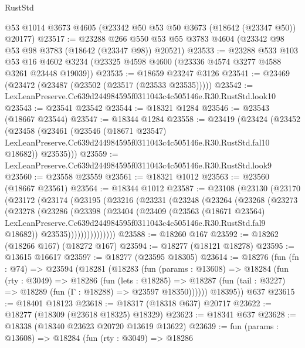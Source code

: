 \begin{lexlean}{RustStd}
\begin{coremodule}
    @53
    @1014
    @3673
    @4605
    (@23342 @50 @53 @50 @3673 (@18642 (@23347 @50)) @20177)
@23517 := @23288
    @266
    @550
    @53
    @55
    @3783
    @4604
    (@23342 @98 @53 @98 @3783 (@18642 (@23347 @98)) @20521)
@23533 := @23288
    @533
    @103
    @53
    @16
    @4602
    @3234
    (@23325 @4598 @4600 (@23336 @4574 @3277 @4588 @3261 @23448 @19039))
@23535 := @18659 @23247 @3126
@23541 := @23469 (@23472 (@23487 (@23502 (@23517 (@23533 @23535)))))
@23542 := LexLeanPreserve.Cc639d244984595f0311043c4c505146e.R30.RustStd.look10
@23543 := @23541 @23542
@23544 := @18321 @1284
@23546 := @23543 (@18667 @23544)
@23547 := @18344 @1284
@23558 := @23419
    (@23424
      (@23452
        (@23458
          (@23461
            (@23546
              (@18671 @23547)
              LexLeanPreserve.Cc639d244984595f0311043c4c505146e.R30.RustStd.fal10
              @18682))
          @23535)))
@23559 := LexLeanPreserve.Cc639d244984595f0311043c4c505146e.R30.RustStd.look9
@23560 := @23558 @23559
@23561 := @18321 @1012
@23563 := @23560 (@18667 @23561)
@23564 := @18344 @1012
@23587 := @23108
    (@23130
      (@23170
        (@23172
          (@23174
            (@23195
              (@23216
                (@23231
                  (@23248
                    (@23264
                      (@23268
                        (@23273
                          (@23278
                            (@23286
                              (@23398
                                (@23404
                                  (@23409
                                    (@23563
                                      (@18671 @23564)
                                      LexLeanPreserve.Cc639d244984595f0311043c4c505146e.R30.RustStd.fal9
                                      @18682))
                                  @23535)))))))))))))))
@23588 := @18260 @167
@23592 := @18262 (@18266 @167) (@18272 @167)
@23594 := @18277 (@18121 @18278)
@23595 := @13615 @16617
@23597 := @18277 (@23595 @18305)
@23614 := @18276
    (fun (fn : @74) =>
    @23594
      (@18281
        (@18283
          (fun (params : @13608) =>
          @18284
            (fun (rty : @3049) =>
            @18286
              (fun (lets : @18285) =>
              @18287 (fun (tail : @3227) => @18289 (fun (Γ : @18288) => @23597 @18350))))))
        @18395))
    @637
@23615 := @18401 @18123
@23618 := @18317 (@18318 @637) @20717
@23622 := @18277 (@18309 (@23618 @18325) @18329)
@23623 := @18341 @637
@23628 := @18338 (@18340 @23623 @20720 @13619 @13622)
@23639 := fun (params : @13608) =>
  @18284
    (fun (rty : @3049) =>
    @18286

\end{coremodule}
\end{lexlean}
